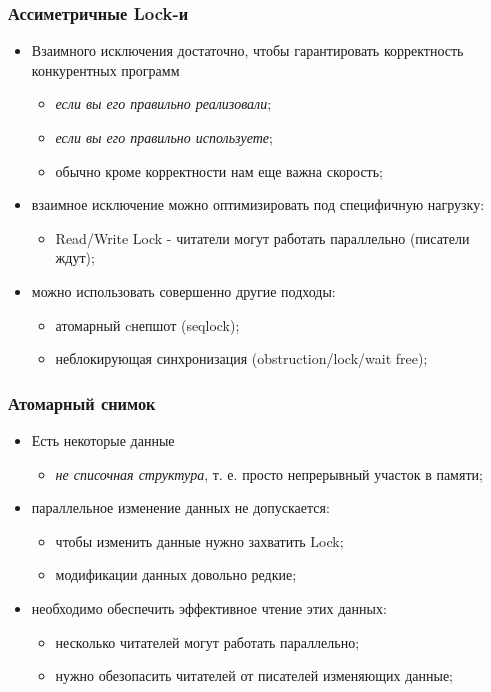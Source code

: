 \begin{frame}
\frametitle{Ассиметричные Lock-и}

\begin{itemize}
  \item<1-> Взаимного исключения достаточно, чтобы гарантировать корректность
        конкурентных программ
        \begin{itemize}
          \item<2-> \emph{если вы его правильно реализовали};
          \item<3-> \emph{если вы его правильно используете};
          \item<4-> обычно кроме корректности нам еще важна скорость;
        \end{itemize}
  \item<5-> взаимное исключение можно оптимизировать под специфичную нагрузку:
        \begin{itemize}
          \item Read/Write Lock - читатели могут работать параллельно (писатели
                ждут);
        \end{itemize}
  \item<6-> можно использовать совершенно другие подходы:
        \begin{itemize}
          \item атомарный cнепшот (seqlock);
          \item неблокирующая синхронизация (obstruction/lock/wait free);
        \end{itemize}
\end{itemize}
\end{frame}

\begin{frame}
\frametitle{Атомарный снимок}

\begin{itemize}
  \item<1-> Есть некоторые данные
        \begin{itemize}
          \item \emph{не списочная структура}, т. е. просто непрерывный участок
                в памяти;
        \end{itemize}
  \item<2-> параллельное изменение данных не допускается:
        \begin{itemize}
          \item чтобы изменить данные нужно захватить Lock;
          \item модификации данных довольно редкие;
        \end{itemize}
  \item<3-> необходимо обеспечить эффективное чтение этих данных:
        \begin{itemize}
          \item несколько читателей могут работать параллельно;
          \item нужно обезопасить читателей от писателей изменяющих данные;
        \end{itemize}
\end{itemize}
\end{frame}

